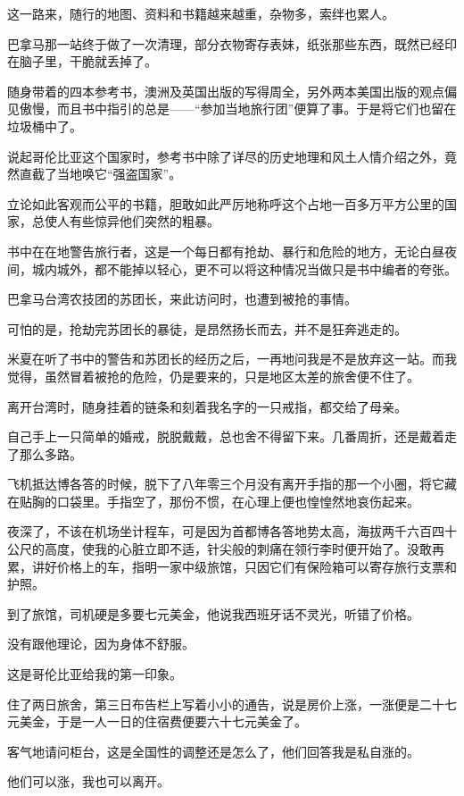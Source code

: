 \par 这一路来，随行的地图、资料和书籍越来越重，杂物多，索绊也累人。
\par 巴拿马那一站终于做了一次清理，部分衣物寄存表妹，纸张那些东西，既然已经印在脑子里，干脆就丢掉了。
\par 随身带着的四本参考书，澳洲及英国出版的写得周全，另外两本美国出版的观点偏见傲慢，而且书中指引的总是——“参加当地旅行团”便算了事。于是将它们也留在垃圾桶中了。
\par 说起哥伦比亚这个国家时，参考书中除了详尽的历史地理和风土人情介绍之外，竟然直截了当地唤它“强盗国家”。
\par 立论如此客观而公平的书籍，胆敢如此严厉地称呼这个占地一百多万平方公里的国家，总使人有些惊异他们突然的粗暴。
\par 书中在在地警告旅行者，这是一个每日都有抢劫、暴行和危险的地方，无论白昼夜间，城内城外，都不能掉以轻心，更不可以将这种情况当做只是书中编者的夸张。
\par 巴拿马台湾农技团的苏团长，来此访问时，也遭到被抢的事情。
\par 可怕的是，抢劫完苏团长的暴徒，是昂然扬长而去，并不是狂奔逃走的。
\par 米夏在听了书中的警告和苏团长的经历之后，一再地问我是不是放弃这一站。而我觉得，虽然冒着被抢的危险，仍是要来的，只是地区太差的旅舍便不住了。
\par 离开台湾时，随身挂着的链条和刻着我名字的一只戒指，都交给了母亲。
\par 自己手上一只简单的婚戒，脱脱戴戴，总也舍不得留下来。几番周折，还是戴着走了那么多路。
\par 飞机抵达博各答的时候，脱下了八年零三个月没有离开手指的那一个小圈，将它藏在贴胸的口袋里。手指空了，那份不惯，在心理上便也惶惶然地哀伤起来。
\par 夜深了，不该在机场坐计程车，可是因为首都博各答地势太高，海拔两千六百四十公尺的高度，使我的心脏立即不适，针尖般的刺痛在领行李时便开始了。没敢再累，讲好价格上的车，指明一家中级旅馆，只因它们有保险箱可以寄存旅行支票和护照。
\par 到了旅馆，司机硬是多要七元美金，他说我西班牙话不灵光，听错了价格。
\par 没有跟他理论，因为身体不舒服。
\par 这是哥伦比亚给我的第一印象。
\par 住了两日旅舍，第三日布告栏上写着小小的通告，说是房价上涨，一涨便是二十七元美金，于是一人一日的住宿费便要六十七元美金了。
\par 客气地请问柜台，这是全国性的调整还是怎么了，他们回答我是私自涨的。
\par 他们可以涨，我也可以离开。
